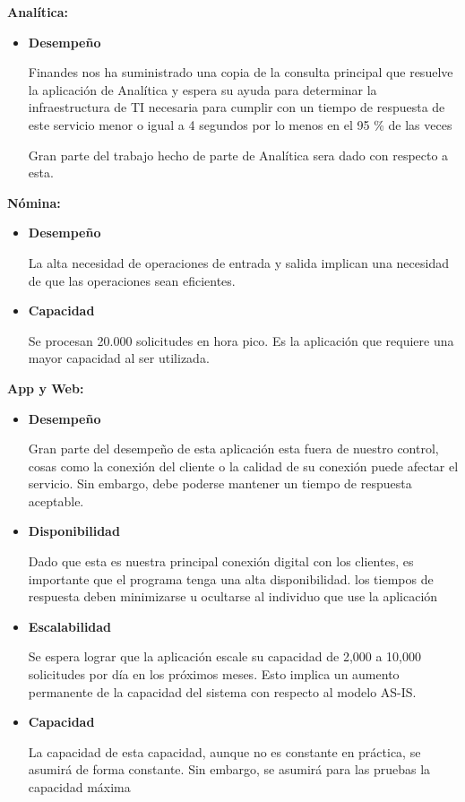 \documentclass[a4paper]{article}
\begin{document}
\textbf{Analítica:}
\begin{itemize}
    \item \textbf{Desempeño}

    Finandes nos ha suministrado una copia de la consulta principal que resuelve la aplicación de Analítica y
    espera su ayuda para determinar la infraestructura de TI necesaria para cumplir con un tiempo de respuesta de
    este servicio menor o igual a 4 segundos por lo menos en el 95 \% de las veces
    
    Gran parte del trabajo hecho de parte de Analítica sera dado con respecto a esta. 
\end{itemize}

\textbf{Nómina:}
\begin{itemize}
    \item \textbf{Desempeño}
    
    La alta necesidad de operaciones de entrada y salida implican una necesidad de que las operaciones sean eficientes.  

    \item \textbf{Capacidad}
    
    Se procesan 20.000 solicitudes en hora pico. Es la aplicación que requiere una mayor capacidad 
    al ser utilizada.

\end{itemize}

\textbf{App y Web:}
\begin{itemize}
    \item \textbf{Desempeño}
    
    Gran parte del desempeño de esta aplicación esta fuera de nuestro control, cosas como la conexión del
    cliente o la calidad de su conexión puede afectar el servicio. Sin embargo, debe poderse mantener un tiempo
    de respuesta aceptable.

    \item \textbf{Disponibilidad}
    
    Dado que esta es nuestra principal conexión digital con los clientes, es importante que el programa
    tenga una alta disponibilidad. los tiempos de respuesta deben minimizarse u ocultarse al individuo que 
    use la aplicación

    \item \textbf{Escalabilidad} 
    
    Se espera lograr que la aplicación escale su capacidad de 
    2,000 a 10,000 solicitudes por día en los próximos meses. Esto
    implica un aumento permanente de la capacidad del sistema con respecto al
    modelo AS-IS.
    
    \item \textbf{Capacidad}
    
    La capacidad de esta capacidad, aunque no es constante en práctica, se asumirá de forma
    constante. Sin embargo, se asumirá para las pruebas la capacidad máxima

\end{itemize}
\end{document}
